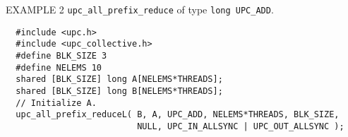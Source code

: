 %
%
%
%
%
%
%
\np EXAMPLE 2 {\tt upc\_all\_prefix\_reduce} of type {\tt long UPC\_ADD}.

\begin{verbatim}
  #include <upc.h>
  #include <upc_collective.h>
  #define BLK_SIZE 3
  #define NELEMS 10
  shared [BLK_SIZE] long A[NELEMS*THREADS];
  shared [BLK_SIZE] long B[NELEMS*THREADS];
  // Initialize A.
  upc_all_prefix_reduceL( B, A, UPC_ADD, NELEMS*THREADS, BLK_SIZE,
                          NULL, UPC_IN_ALLSYNC | UPC_OUT_ALLSYNC );
\end{verbatim}

